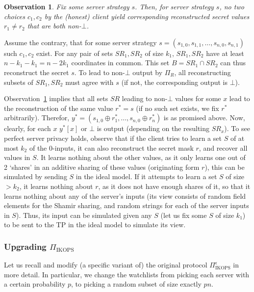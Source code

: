 \documentclass[a4paper]{article}
\newtheorem{observation}{Observation}
\begin{document}
\begin{observation}\label{obs-1}
Fix some server strategy $s$. Then, for server strategy $s$, no two choices $c_1,c_2$ by the (honest) client yield corresponding reconstructed secret values $r_1\neq r_2$ that are both non-$\bot$. 	
\end{observation}

Assume the contrary, that for some server strategy $s=(s_{1,0},s_{1,1},\ldots,s_{n,0},s_{n,1})$ such $c_1,c_2$ exist.
For any pair of sets $SR_1,SR_2$ of size $k_1$, $SR_1,SR_2$ have at least $n-k_1-k_1=n-2k_1$ coordinates in common. This set $B=SR_1\cap SR_2$ can thus reconstruct the secret $s$. To lead to non-$\bot$ output by $\Pi_R$, all reconstructing subsets of $SR_1,SR_2$ must agree with $s$ (if not, the corresponding output is $\bot$).


Observation~\ref{obs-1} implies that all sets $SR$ leading to non-$\bot$ values for some $x$ lead to the reconstruction of the same value $r^*=s$ (if no such set exists, we fix $r^*$ arbitrarily). Therefor, $y^*=(s_{1,0}\oplus r^*_1,\ldots,s_{n,0}\oplus r^*_n)$ is as promised above. Now, clearly, for each $x$ $y^*[x]$ or $\bot$ is output (depending on the resulting $SR_x$). To see perfect server privacy holds, observe that if the client tries to learn a set $S$ of at most $k_2$ of the 0-inputs, it can also reconstruct the secret mask $r$, and recover all values in $S$.
It learns nothing about the other values, as it only learns one out of 2 `shares' in an additive sharing of these values (originating form $r$), this can be simulated by sending $S$ in the ideal model.
If it attempts to learn a set $S$ of size $>k_2$, it learns nothing about $r$, as it does not have enough shares of it, so that it learns nothing about any of the server's inputs (its view consists of random field elements for the Shamir sharing, and random strings for each of the server inputs in $S$). Thus, its input can be simulated given any $S$
(let us fix some $S$ of size $k_1$) to be sent to the TP in the ideal model to simulate its view.

\subsubsection{Upgrading $\Pi_{\text{IKOPS}}$}

Let us recall and modify (a specific variant of) the original protocol $\Pi^{\epsilon}_{\text{IKOPS}}$ in more detail.
In particular, we change the watchlists from picking each server with
a certain probability $p$, to picking a random subset of size exactly $pn$. 
\end{document}
